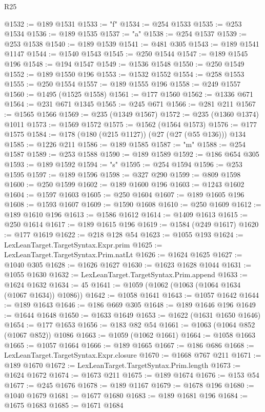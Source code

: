 \begin{lexlean}{R25}
\begin{coremodule}
@1532 := @189 @1531
@1533 := "f"
@1534 := @254 @1533
@1535 := @253 @1534
@1536 := @189 @1535
@1537 := "a"
@1538 := @254 @1537
@1539 := @253 @1538
@1540 := @189 @1539
@1541 := @481 @305
@1543 := @189 @1541 @1147
@1544 := @1540 @1543
@1545 := @250 @1544
@1547 := @189 @1545 @196
@1548 := @194 @1547
@1549 := @1536 @1548
@1550 := @250 @1549
@1552 := @189 @1550 @196
@1553 := @1532 @1552
@1554 := @258 @1553
@1555 := @250 @1554
@1557 := @189 @1555 @196
@1558 := @249 @1557
@1560 := @1495 (@1525 @1558)
@1561 := @177 @1560
@1562 := @1336 @671
@1564 := @231 @671 @1345
@1565 := @245 @671
@1566 := @281 @211
@1567 := @1565 @1566
@1569 := @235 (@1349 @1567)
@1572 := @235 (@1360 @1374) @1011
@1573 := @1569 @1572
@1575 := @1562 (@1564 @1573)
@1576 := @177 @1575
@1584 := @178 (@180 (@215 @1127)) (@27 (@27 (@55 @136))) @134
@1585 := @1226 @211
@1586 := @189 @1585
@1587 := "m"
@1588 := @254 @1587
@1589 := @253 @1588
@1590 := @189 @1589
@1592 := @186 @654 @305
@1593 := @189 @1592
@1594 := "s"
@1595 := @254 @1594
@1596 := @253 @1595
@1597 := @189 @1596
@1598 := @327 @290
@1599 := @809 @1598
@1600 := @250 @1599
@1602 := @189 @1600 @196
@1603 := @1243 @1602
@1604 := @1597 @1603
@1605 := @250 @1604
@1607 := @189 @1605 @196
@1608 := @1593 @1607
@1609 := @1590 @1608
@1610 := @250 @1609
@1612 := @189 @1610 @196
@1613 := @1586 @1612
@1614 := @1409 @1613
@1615 := @250 @1614
@1617 := @189 @1615 @196
@1619 := @1584 (@249 @1617)
@1620 := @177 @1619
@1622 := @218 @128 @54
@1623 := @1055 @193
@1624 := LexLeanTarget.TargetSyntax.Expr.prim
@1625 := LexLeanTarget.TargetSyntax.Prim.natLt
@1626 := @1624 @1625
@1627 := @1040 @305
@1628 := @1626 @1627
@1630 := @1623 @1628 @1044
@1631 := @1055 @1630
@1632 := LexLeanTarget.TargetSyntax.Prim.append
@1633 := @1624 @1632
@1634 := 45
@1641 := @1059 (@1062 (@1063 (@1064 @1634 (@1067 @1634)) @1086))
@1642 := @1058 @1641
@1643 := @1057 @1642
@1644 := @189 @1643
@1646 := @186 @669 @305
@1648 := @189 @1646 @196
@1649 := @1644 @1648
@1650 := @1633 @1649
@1653 := @1622 (@1631 @1650 @1646)
@1654 := @177 @1653
@1656 := @183 @82 @54
@1661 := @1063 (@1064 @852 (@1067 @852)) @1086
@1663 := @1059 (@1062 @1661)
@1664 := @1058 @1663
@1665 := @1057 @1664
@1666 := @189 @1665
@1667 := @186 @686
@1668 := LexLeanTarget.TargetSyntax.Expr.closure
@1670 := @1668 @767 @211
@1671 := @189 @1670
@1672 := LexLeanTarget.TargetSyntax.Prim.length
@1673 := @1624 @1672
@1674 := @1673 @211
@1675 := @189 @1674
@1676 := @153 @54
@1677 := @245 @1676
@1678 := @189 @1167
@1679 := @1678 @196
@1680 := @1040 @1679
@1681 := @1677 @1680
@1683 := @189 @1681 @196
@1684 := @1675 @1683
@1685 := @1671 @1684

\end{coremodule}
\end{lexlean}

